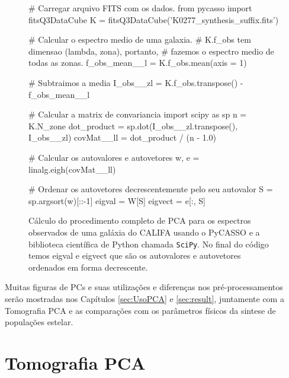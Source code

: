 \begin{figure}
\begin{python}
# Carregar arquivo FITS com os dados.
from pycasso import fitsQ3DataCube
K = fitsQ3DataCube('K0277_synthesis_suffix.fits')

# Calcular o espectro medio de uma galaxia. 
# K.f_obs tem dimensao (lambda, zona), portanto, 
# fazemos o espectro medio de todas as zonas.
f_obs_mean__l = K.f_obs.mean(axis = 1)

# Subtraimos a media
I_obs__zl = K.f_obs.transpose() - f_obs_mean__l

# Calcular a matrix de convariancia
import scipy as sp
n = K.N_zone
dot_product = sp.dot(I_obs__zl.transpose(), I_obs__zl)
covMat__ll = dot_product / (n - 1.0)   

# Calcular os autovalores e autovetores
w, e = linalg.eigh(covMat__ll)

# Ordenar os autovetores decrescentemente pelo seu autovalor
S = sp.argsort(w)[::-1]
eigval = W[S]
eigvect = e[:, S]
\end{python}
	\caption[Exemplo de cálculo de PCA usando o PyCASSO e SciPy] {Cálculo do
	procedimento completo de PCA para os espectros observados de uma galáxia do
	CALIFA usando o PyCASSO e a biblioteca científica de Python chamada
	\texttt{SciPy}. No final do código temos eigval e eigvect que são os
	autovalores e autovetores ordenados em forma decrescente.}
	\label{fig:PCA:covMatrix}
\end{figure}
Muitas figuras de PCs e suas utilizações e diferenças nos pré-processamentos
serão mostradas nos Capítulos \ref{sec:UsoPCA} e \ref{sec:result}, juntamente
com a Tomografia PCA e as comparações com os parâmetros físicos da sintese de
populações estelar.


\section{Tomografia PCA}
\label{sec:PCAeTomoPCA:TomoPCA}

